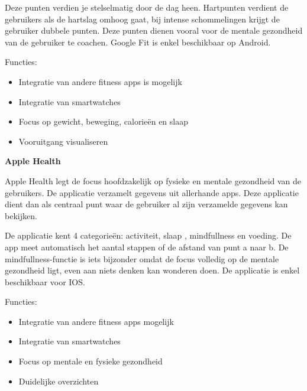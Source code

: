 Deze punten verdien je stelselmatig door de dag heen. Hartpunten verdient de gebruikers als de hartslag omhoog gaat, bij intense schommelingen krijgt de gebruiker dubbele punten. Deze punten dienen vooral voor de mentale gezondheid van de gebruiker te coachen.
Google Fit is enkel beschikbaar op Android.

Functies:
\begin{itemize}
\item Integratie van andere fitness apps is mogelijk
\item Integratie van smartwatches
\item Focus op gewicht, beweging, calorieën en slaap
\item Vooruitgang visualiseren                                                          
\end{itemize}

\textbf{Apple Health}

Apple Health legt de focus hoofdzakelijk op fysieke en mentale gezondheid van de gebruikers. De applicatie verzamelt gegevens uit allerhande apps. Deze applicatie dient dan als centraal punt waar de gebruiker al zijn verzamelde gegevens kan bekijken.

De applicatie kent 4 categorieën: activiteit, slaap , mindfullness en voeding. De app meet automatisch het aantal stappen of de afstand van punt a naar b. De mindfullness-functie is iets bijzonder omdat de focus volledig op de mentale gezondheid ligt, even aan niets denken kan wonderen doen. De applicatie is enkel beschikbaar voor IOS.

Functies:
\begin{itemize}
\item Integratie van andere fitness apps mogelijk
\item Integratie van smartwatches
\item Focus op mentale en fysieke gezondheid
\item Duidelijke overzichten
\end{itemize}
